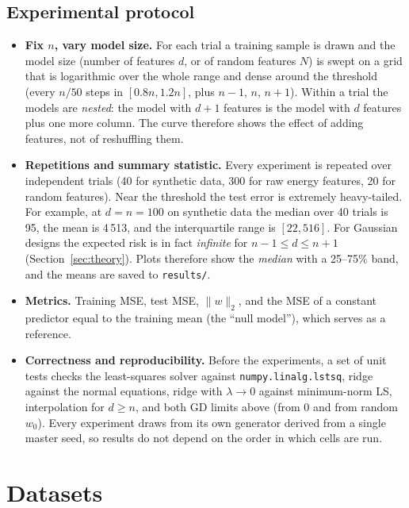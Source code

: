 \documentclass[10pt,a4paper]{article}
\newcommand{\norm}[1]{\lVert #1 \rVert}
\begin{document}
\subsection{Experimental protocol}
\begin{itemize}
  \item \textbf{Fix $n$, vary model size.} For each trial a training sample is drawn and the model size (number of features $d$, or of random features $N$) is swept on a grid that is logarithmic over the whole range and dense around the threshold (every $n/50$ steps in $[0.8n, 1.2n]$, plus $n-1$, $n$, $n+1$). Within a trial the models are \emph{nested}: the model with $d+1$ features is the model with $d$ features plus one more column. The curve therefore shows the effect of adding features, not of reshuffling them.
  \item \textbf{Repetitions and summary statistic.} Every experiment is repeated over independent trials (40 for synthetic data, 300 for raw energy features, 20 for random features). Near the threshold the test error is extremely heavy-tailed. For example, at $d=n=100$ on synthetic data the median over 40 trials is 95, the mean is 4\,513, and the interquartile range is $[22, 516]$. For Gaussian designs the expected risk is in fact \emph{infinite} for $n-1\le d\le n+1$ (Section~\ref{sec:theory}). Plots therefore show the \emph{median} with a 25--75\% band, and the means are saved to \texttt{results/}.
  \item \textbf{Metrics.} Training MSE, test MSE, $\norm{w}_2$, and the MSE of a constant predictor equal to the training mean (the ``null model''), which serves as a reference.
  \item \textbf{Correctness and reproducibility.} Before the experiments, a set of unit tests checks the least-squares solver against \texttt{numpy.linalg.lstsq}, ridge against the normal equations, ridge with $\lambda\to0$ against minimum-norm LS, interpolation for $d\ge n$, and both GD limits above (from $0$ and from random $w_0$). Every experiment draws from its own generator derived from a single master seed, so results do not depend on the order in which cells are run.
\end{itemize}

\section{Datasets}
\end{document}
